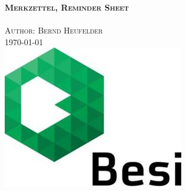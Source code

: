 \documentclass[a4paper, 12pt]{article}
\begin{document}
	\begin{titlepage}
		\center 
		\textsc{\huge \bfseries Merkzettel, Reminder Sheet}\\[1cm] 
		\textsc{\Large }\\[0.5cm] 
		\textsc{\large Author: Bernd Heufelder}\\[0.5cm] 
		{\large \today}\\[1cm] 
		\includegraphics[width=0.3\linewidth]{./pics/BesiLogo.jpg}\\[1cm]
		\begin{flushleft}
			\tableofcontents
		\end{flushleft}
	\end{titlepage}
	



\end{document}
